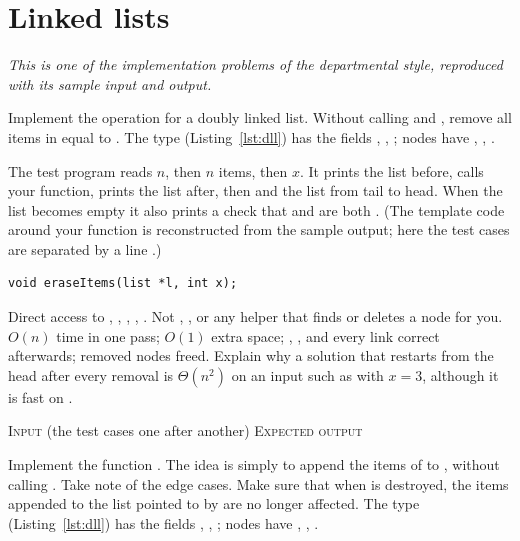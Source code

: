 \section{Linked lists}\label{sec:problinked}

\emph{This is one of the implementation problems of the departmental style, reproduced
with its sample input and output.}

Implement the operation  for a doubly linked list.
Without calling  and , remove all items in  equal to .
The type  (Listing~\ref{lst:dll}) has the fields , ,
; nodes have , , .

The test program reads $n$, then $n$ items, then $x$. It prints the list before, calls
your function, prints the list after, then  and the list from tail to head.
When the list becomes empty it also prints a check that  and  are both
. (The template code around your function is reconstructed from the sample
output; here the test cases are separated by a line \cc{----}.)
\begin{lstlisting}[style=starter]
void eraseItems(list *l, int x);
\end{lstlisting}
\permitted Direct access to , , , , . Not
, ,  or any helper that finds or deletes a node for you.
\required $O(n)$ time in one pass; $O(1)$ extra space; , , 
and every  link correct afterwards; removed nodes freed.
\bonus Explain why a solution that restarts from the head after every removal is
$\Theta(n^2)$ on an input such as  with $x=3$, although
it is fast on .

\par\smallskip\noindent\textsc{\small Input} (the test cases one after another)
\noindent\textsc{\small Expected output}

Implement the function . The idea is simply to
append the items of  to , without calling . Take note of the edge
cases. Make sure that when  is destroyed, the items appended to the list pointed to
by  are no longer affected. The type  (Listing~\ref{lst:dll}) has the
fields , , ; nodes have , , .

